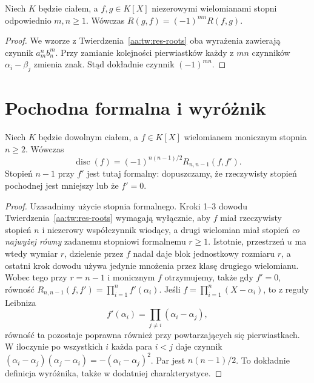 \begin{wniosek}\label{aa:wn:res-sym}
Niech $K$ będzie ciałem, a $f,g\in K[X]$ niezerowymi wielomianami
stopni odpowiednio $m,n\ge1$. Wówczas
$R(g,f)=(-1)^{mn}R(f,g)$.
\end{wniosek}
\begin{proof}
We wzorze z Twierdzenia~\ref{aa:tw:res-roots} oba wyrażenia
zawierają czynnik $a_m^nb_n^m$. Przy zamianie kolejności
pierwiastków każdy z $mn$ czynników $\alpha_i-\beta_j$
zmienia znak. Stąd dokładnie czynnik $(-1)^{mn}$.
\end{proof}

\section{Pochodna formalna i wyróżnik}
\begin{twierdzenie}\label{aa:tw:disc-resultant}
Niech $K$ będzie dowolnym ciałem, a $f\in K[X]$ wielomianem
monicznym stopnia $n\ge2$. Wówczas
\[
 \operatorname{disc}(f)=(-1)^{n(n-1)/2}R_{n,n-1}(f,f').
\]
Stopień $n-1$ przy $f'$ jest tutaj formalny: dopuszczamy,
że rzeczywisty stopień pochodnej jest mniejszy lub że $f'=0$.
\end{twierdzenie}
\begin{proof}
Uzasadnimy użycie stopnia formalnego. Kroki 1--3 dowodu
Twierdzenia~\ref{aa:tw:res-roots} wymagają wyłącznie, aby
$f$ miał rzeczywisty stopień $n$ i niezerowy współczynnik wiodący,
a drugi wielomian miał stopień \emph{co najwyżej równy}
zadanemu stopniowi formalnemu $r\ge1$. Istotnie, przestrzeń $u$ ma wtedy
wymiar $r$, dzielenie przez $f$ nadal daje blok jednostkowy
rozmiaru $r$, a ostatni krok dowodu używa jedynie mnożenia przez
klasę drugiego wielomianu. Wobec tego przy $r=n-1$ i monicznym
$f$ otrzymujemy, także gdy $f'=0$, równość
$R_{n,n-1}(f,f')=\prod_{i=1}^n f'(\alpha_i)$.
Jeśli $f=\prod_{i=1}^n(X-\alpha_i)$, to z reguły Leibniza
\[
 f'(\alpha_i)=\prod_{j\ne i}(\alpha_i-\alpha_j),
\]
równość ta pozostaje poprawna również przy powtarzających się
pierwiastkach. W iloczynie po wszystkich $i$ każda para
$i<j$ daje czynnik
$(\alpha_i-\alpha_j)(\alpha_j-\alpha_i)
=-(\alpha_i-\alpha_j)^2$. Par jest $n(n-1)/2$.
To dokładnie definicja wyróżnika, także w dodatniej charakterystyce.
\end{proof}


